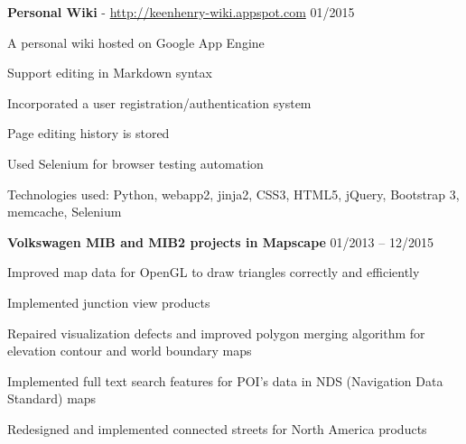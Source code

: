 \documentclass[margin,line]{resume}
\begin{document}
\begin{resume}
    \textbf{Personal Wiki} - \url{http://keenhenry-wiki.appspot.com} \hfill 01/2015 \vspace{-3mm}\\\vspace{-1mm}%
      \begin{list2}
       \item A personal wiki hosted on Google App Engine
       \item Support editing in Markdown syntax
       \item Incorporated a user registration/authentication system
       \item Page editing history is stored
       \item Used Selenium for browser testing automation
       \item Technologies used: Python, webapp2, jinja2, CSS3, HTML5, jQuery, Bootstrap 3, memcache, Selenium
      \end{list2}


    \textbf{Volkswagen MIB and MIB2 projects in Mapscape} \hfill 01/2013 -- 12/2015 \vspace{-3mm}\\\vspace{-1mm}%
      \begin{list2}
      \item Improved map data for OpenGL to draw triangles correctly and efficiently
      \item Implemented junction view products
      \item Repaired visualization defects and improved polygon merging algorithm for elevation contour and world boundary maps
      \item Implemented full text search features for POI's data in NDS (Navigation Data Standard) maps
      \item Redesigned and implemented connected streets for North America products
      \end{list2}


\end{resume}
\end{document}
